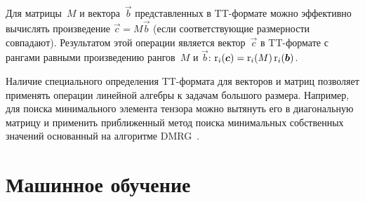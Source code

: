 Для матрицы~$M$ и вектора~$\vec{b}$ представленных в TT\hyp{}формате можно эффективно вычислять произведение $\vec{c}=M\vec{b}$ (если соответствующие размерности совпадают). Результатом этой операции является вектор~$\vec{c}$ в TT\hyp{}формате с рангами равными произведению рангов~$M$ и $\vec{b}$: $\operatorname{r}_i(\boldsymbol{c}) = \operatorname{r}_i(M) \operatorname{r}_i(\boldsymbol{b})$.

Наличие специального определения TT\hyp{}формата для векторов и матриц позволяет применять операции линейной алгебры к задачам большого размера. Например, для поиска минимального элемента тензора можно вытянуть его в диагональную матрицу и применить приближенный метод поиска минимальных собственных значений основанный на алгоритме DMRG~\cite{khoromskij2010dmrg}.

\section{Машинное обучение} \label{sec:ml}
